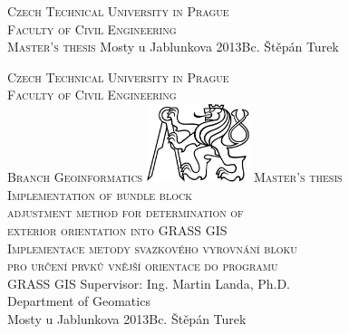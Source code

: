 \begin{center}



\newcommand{\napisCVUT}{Czech Technical University in Prague}
\newcommand{\napisFS}{Faculty of Civil Engineering}
\newcommand{\napisObor}{Branch Geoinformatics}
\newcommand{\napisKatedra}{Department of Geomatics}
\newcommand{\napisVedouci}{Ing. Martin Landa, Ph.D.}
\newcommand{\napisAutor}{Bc. Štěpán Turek}
\newcommand{\napisDatum}{Mosty u Jablunkova 2013}
\newcommand{\napisNazevI}{Implementation of bundle block}
\newcommand{\napisNazevII}{adjustment method for determination of}
\newcommand{\napisNazevIII}{exterior orientation into GRASS GIS}
\newcommand{\napisNazevAjI}{Implementace metody svazkového vyrovnání bloku}
\newcommand{\napisNazevAjII}{pro určení prvků vnější orientace do programu}
\newcommand{\napisNazevAjIII}{GRASS GIS}
\newcommand{\napisBakalarka}{Master’s thesis}
\newcommand{\napisPraha}{Mosty u Jablunkova 2013}


%
\newcommand{\velka}[1]{\textsc{#1}}
%
% 
\newif\ifpatitul
\patitultrue

\ifpatitul
{\Large\velka{\napisCVUT}}\\
\velka{\Large\napisFS}\\
\vfill
{\LARGE\velka{\napisBakalarka}}
\vfill
{\large\napisPraha\hfill\napisAutor}
\newpage
\fi%



{\Large\velka{\napisCVUT}}\\
{\Large\velka{\napisFS}}\\
{\Large\velka{\napisObor}}
\vfill
\includegraphics[width=3cm]{logo_cvut_cb} %
\vfill
{\Large\velka{\napisBakalarka}}\\
{\Large\velka{\napisNazevI\\
\napisNazevII\\
\napisNazevIII}}\\
{\large\velka{\napisNazevAjI\\
\napisNazevAjII\\
\napisNazevAjIII}}
\vfill
{\large%
Supervisor: \napisVedouci\\
\napisKatedra\\
\bigskip
\napisDatum\hfill\napisAutor}
\end{center}
